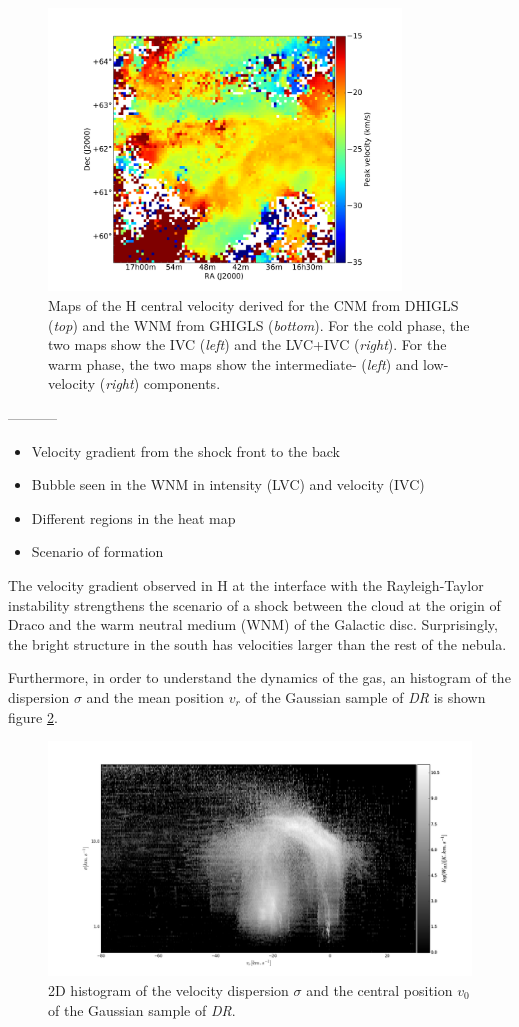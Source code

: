 \documentclass[traditabstract]{aa}
\begin{document}
\begin{figure}[h]
  \includegraphics[page=5,height=7.5cm,trim=110 30 130 75,clip=true]{Figures/GHIGLS_velo.pdf}
  \caption{\label{velo_HI} Maps of the H central velocity derived for the CNM from DHIGLS (\emph{top}) and the WNM from GHIGLS (\emph{bottom}). For the cold phase, the two maps show the IVC (\emph{left}) and the LVC+IVC (\emph{right}). For the warm phase, the two maps show the intermediate- (\emph{left}) and low-velocity (\emph{right}) components.}
\end{figure}

-----------

\begin{itemize}
  \item Velocity gradient from the shock front to the back
  \item Bubble seen in the WNM in intensity (LVC) and velocity (IVC)
  \item Different regions in the heat map
  \item Scenario of formation
\end{itemize}

    The velocity gradient observed in H at the interface  with the Rayleigh-Taylor instability strengthens the scenario of a shock between the cloud at the origin of Draco and the warm neutral 
 medium (WNM) of the Galactic disc. Surprisingly, the bright structure in the south has velocities larger than the rest of the nebula.

Furthermore, in order to understand the dynamics of the gas, an histogram of the 
dispersion $\sigma$ and the mean position $v_{r}$ of the Gaussian sample of \textit{DR} is shown figure \ref{heatmap}.

\begin{figure}
  \centering
  \includegraphics[width=0.7\linewidth,trim=105 30 75 70,clip=true]{Figures/heatmap_png.png}
  \caption{\label{heatmap} 2D histogram of the velocity dispersion $\sigma$ and the central position $v_0$ of the Gaussian sample of \textit{DR}.}
\end{figure}
\end{document}

